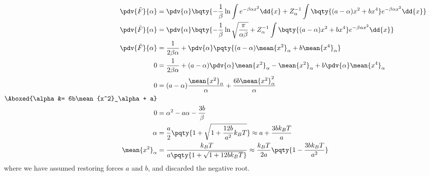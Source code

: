 \documentclass[12pt]{article}
\begin{document}
    \begin{align*}
        \pdv{\tilde{F}}{\alpha} &= \pdv{\alpha}\bqty{ -\frac{1}{\beta}\ln\int   e^{ - \beta \alpha x^2} \dd{x} + Z^{- 1}_\alpha\int\bqty{(a - \alpha)x^2 + bx^4 } e^{ - \beta \alpha x^2}\dd{x}}\\
        \pdv{\tilde{F}}{\alpha} &= \pdv{\alpha}\bqty{ -\frac{1}{\beta}\ln \sqrt{\frac{\pi}{\alpha\beta}} + Z^{- 1}_\alpha\int\bqty{(a - \alpha)x^2 + bx^4 } e^{ - \beta \alpha x^2}\dd{x}}\\
        \pdv{\tilde{F}}{\alpha} &=  \frac{1}{2\beta\alpha} + \pdv{\alpha}\pqty{(a - \alpha) \mean{x^2}_\alpha + b\mean{x^4}_\alpha}\\
        0 &= \frac{1}{2\beta \alpha} + (a - \alpha)\pdv{\alpha}\mean{x^2}_\alpha -\mean{x^2}_\alpha +  b\pdv{\alpha}\mean{x^4}_\alpha  \\
        0 &= (a - \alpha) \frac{\mean{x^2}_\alpha}{\alpha} + \frac{6b\mean{x^2}_\alpha^2}{\alpha} \\
        \Aboxed{\alpha &= 6b\mean{x^2}_\alpha + a}\\
        0 &= \alpha^2 - a \alpha - \frac{3b}{\beta}\\
        \alpha &= \frac{a}{2}\pqty{1 + \sqrt{1 + \frac{12b}{a^2} k_BT}} \approx a + \frac{3b k_BT}{a} \\
        \mean{x^2}_\alpha &= \frac{k_BT}{a\pqty{1 + \sqrt{1 + 12b k_BT}}} \approx \frac{k_BT}{2a} \pqty{1 - \frac{3b k_BT}{a^2} }
    \end{align*}
    where we have assumed restoring forces \(a\) and \(b\), and discarded the negative root.
\end{document}
